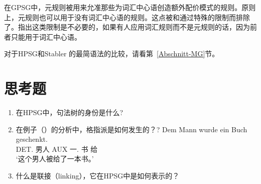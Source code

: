 在GPSG中，元规则被用来允准那些为词汇中心语创造额外配价模式的规则。原则上，元规则也可以用于没有词汇中心语的规则。这点被\citet{Flickinger83a-u}和\citet[]{GKPS85a}通过特殊的限制而排除了。\citet*[]{FPW85a}指出这类限制是不必要的，如果有人应用词汇规则而不是元规则的话，因为前者只能用于词汇中心语。

对于HPSG和Stabler 的最简语法\indexmg 的比较，请看第~\ref{Abschnitt-MG}节。


\section*{思考题}

\begin{enumerate}
\item 在HPSG中，句法树的身份是什么?
\item 在例子（）的分析中，格指派是如何发生的？?
\ea
\gll Dem Mann wurde ein Buch geschenkt.\\
	 DET.\dat{} 男人 AUX 一.\nom{} 书 给\\
\glt `这个男人被给了一本书。'
\z
\item 什么是联接（linking），它在HPSG中是如何表示的？
\end{enumerate}


